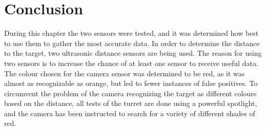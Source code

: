 \section{Conclusion}
During this chapter the two sensors were tested, and it was determined how best
to use them to gather the most accurate data. In order to determine the distance
to the target, two ultrasonic distance sensors are being used. The reason for
using two sensors is to increase the chance of at least one sensor to receive
useful data. The colour chosen for the camera sensor was determined to be red,
as it was almost as recognizable as orange, but led to fewer instances of
false positives. To circumvent the problem of the camera recognizing the
target as different colours based on the distance, all tests of the turret are
done using a powerful spotlight, and the camera has been instructed to search
for a variety of different shades of red.
